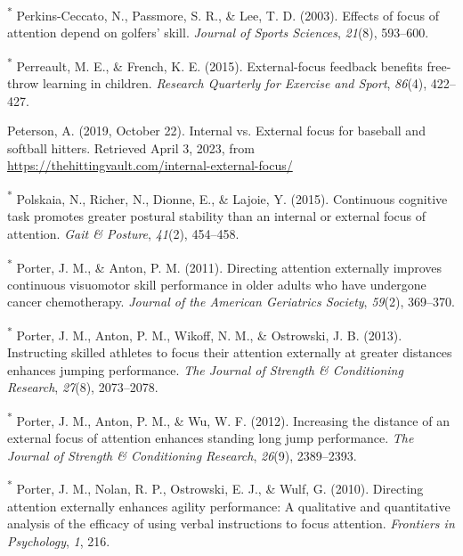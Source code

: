 \documentclass[
  man, donotrepeattitle,floatsintext]{apa7}
\newlength{\cslhangindent}
\newlength{\cslentryspacingunit} %
\newenvironment{CSLReferences}[2] %
 {%
  \setlength{\parindent}{0pt}
  \ifodd #1
  \let\oldpar\par
  \def\par{\hangindent=\cslhangindent\oldpar}
  \fi
  \setlength{\parskip}{#2\cslentryspacingunit}
 }%
 {}
\begin{document}
\begin{CSLReferences}{1}{0}
\leavevmode{}%
\textsuperscript{*} Perkins-Ceccato, N., Passmore, S. R., \& Lee, T. D. (2003). Effects of focus of attention depend on golfers' skill. \emph{Journal of Sports Sciences}, \emph{21}(8), 593--600.

\leavevmode{}%
\textsuperscript{*} Perreault, M. E., \& French, K. E. (2015). External-focus feedback benefits free-throw learning in children. \emph{Research Quarterly for Exercise and Sport}, \emph{86}(4), 422--427.

\leavevmode{}%
Peterson, A. (2019, October 22). Internal vs. External focus for baseball and softball hitters. Retrieved April 3, 2023, from \url{https://thehittingvault.com/internal-external-focus/}

\leavevmode{}%
\textsuperscript{*} Polskaia, N., Richer, N., Dionne, E., \& Lajoie, Y. (2015). Continuous cognitive task promotes greater postural stability than an internal or external focus of attention. \emph{Gait \& Posture}, \emph{41}(2), 454--458.

\leavevmode{}%
\textsuperscript{*} Porter, J. M., \& Anton, P. M. (2011). Directing attention externally improves continuous visuomotor skill performance in older adults who have undergone cancer chemotherapy. \emph{Journal of the American Geriatrics Society}, \emph{59}(2), 369--370.

\leavevmode{}%
\textsuperscript{*} Porter, J. M., Anton, P. M., Wikoff, N. M., \& Ostrowski, J. B. (2013). Instructing skilled athletes to focus their attention externally at greater distances enhances jumping performance. \emph{The Journal of Strength \& Conditioning Research}, \emph{27}(8), 2073--2078.

\leavevmode{}%
\textsuperscript{*} Porter, J. M., Anton, P. M., \& Wu, W. F. (2012). Increasing the distance of an external focus of attention enhances standing long jump performance. \emph{The Journal of Strength \& Conditioning Research}, \emph{26}(9), 2389--2393.

\leavevmode{}%
\textsuperscript{*} Porter, J. M., Nolan, R. P., Ostrowski, E. J., \& Wulf, G. (2010). Directing attention externally enhances agility performance: A qualitative and quantitative analysis of the efficacy of using verbal instructions to focus attention. \emph{Frontiers in Psychology}, \emph{1}, 216.


\end{CSLReferences}
\end{document}

